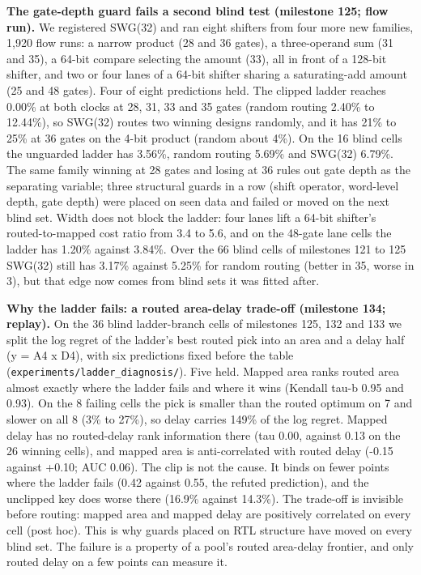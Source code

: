 \documentclass[conference]{IEEEtran}
\begin{document}
\textbf{The gate-depth guard fails a second blind test (milestone 125;
flow run).} We registered SWG(32) and ran eight shifters from four more
new families, 1,920 flow runs: a narrow product (28 and 36 gates), a
three-operand sum (31 and 35), a 64-bit compare selecting the amount
(33), all in front of a 128-bit shifter, and two or four lanes of a
64-bit shifter sharing a saturating-add amount (25 and 48 gates). Four
of eight predictions held. The clipped ladder reaches 0.00\% at both
clocks at 28, 31, 33 and 35 gates (random routing 2.40\% to 12.44\%), so
SWG(32) routes two winning designs randomly, and it has 21\% to 25\% at
36 gates on the 4-bit product (random about 4\%). On the 16 blind cells
the unguarded ladder has 3.56\%, random routing 5.69\% and SWG(32)
6.79\%. The same family winning at 28 gates and losing at 36 rules out
gate depth as the separating variable; three structural guards in a row
(shift operator, word-level depth, gate depth) were placed on seen data
and failed or moved on the next blind set. Width does not block the
ladder: four lanes lift a 64-bit shifter's routed-to-mapped cost ratio
from 3.4 to 5.6, and on the 48-gate lane cells the ladder has 1.20\%
against 3.84\%. Over the 66 blind cells of milestones 121 to 125 SWG(32)
still has 3.17\% against 5.25\% for random routing (better in 35, worse
in 3), but that edge now comes from blind sets it was fitted after.

\textbf{Why the ladder fails: a routed area-delay trade-off (milestone
134; replay).} On the 36 blind ladder-branch cells of milestones 125,
132 and 133 we split the log regret of the ladder's best routed pick
into an area and a delay half (y = A4 x D4), with six predictions fixed
before the table (\texttt{experiments/\allowbreak{}ladder\_\allowbreak{}diagnosis/\allowbreak{}}). Five held.
Mapped area ranks routed area almost exactly where the ladder fails and
where it wins (Kendall tau-b 0.95 and 0.93). On the 8 failing cells the
pick is smaller than the routed optimum on 7 and slower on all 8 (3\% to
27\%), so delay carries 149\% of the log regret. Mapped delay has no
routed-delay rank information there (tau 0.00, against 0.13 on the 26
winning cells), and mapped area is anti-correlated with routed delay
(-0.15 against +0.10; AUC 0.06). The clip is not the cause. It binds on
fewer points where the ladder fails (0.42 against 0.55, the refuted
prediction), and the unclipped key does worse there (16.9\% against
14.3\%). The trade-off is invisible before routing: mapped area and
mapped delay are positively correlated on every cell (post hoc). This is
why guards placed on RTL structure have moved on every blind set. The
failure is a property of a pool's routed area-delay frontier, and only
routed delay on a few points can measure it.
\end{document}
